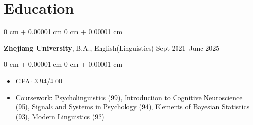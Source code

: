 \documentclass[10pt, letterpaper]{article}
\newenvironment{highlights}{
    \begin{itemize}[
        topsep=0.10 cm,
        parsep=0.10 cm,
        partopsep=0pt,
        itemsep=0pt,
        leftmargin=0 cm + 10pt
    ]
}{
    \end{itemize}
} %
\newenvironment{highlightsforbulletentries}{
    \begin{itemize}[
        topsep=0.10 cm,
        parsep=0.10 cm,
        partopsep=0pt,
        itemsep=0pt,
        leftmargin=10pt
    ]
}{
    \end{itemize}
} %
\newenvironment{onecolentry}{
    \begin{adjustwidth}{
        0 cm + 0.00001 cm
    }{
        0 cm + 0.00001 cm
    }
}{
    \end{adjustwidth}
} %
\newenvironment{twocolentry}[2][]{
    \onecolentry
    \def\secondColumn{#2}
    \setcolumnwidth{\fill, 4.5 cm}
    \begin{paracol}{2}
}{
    \switchcolumn \raggedleft \secondColumn
    \end{paracol}
    \endonecolentry
} %
\begin{document}









\section{Education}


    
    \begin{twocolentry}{
        Sept 2021–June 2025
    }
        \textbf{Zhejiang University}, B.A., English(Linguistics)\end{twocolentry}

    \vspace{0.10 cm}
    \begin{onecolentry}
        \begin{highlights}
            \item GPA: 3.94/4.00%
            \item Coursework: Psycholinguistics (99), Introduction to Cognitive Neuroscience (95), Signals and Systems in Psychology (94), Elements of Bayesian Statistics (93), Modern Linguistics (93)
        \end{highlights}
    \end{onecolentry}
\end{document}
